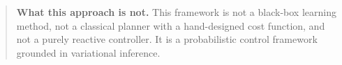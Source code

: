 \documentclass[a4paper, twoside]{article}
\begin{document}
\begin{quote}
\textbf{What this approach is not.}
This framework is not a black-box learning method, not a classical planner with
a hand-designed cost function, and not a purely reactive controller. It is a
probabilistic control framework grounded in variational inference.
\end{quote}


\newpage

\appendix




\printbibliography
\end{document}
